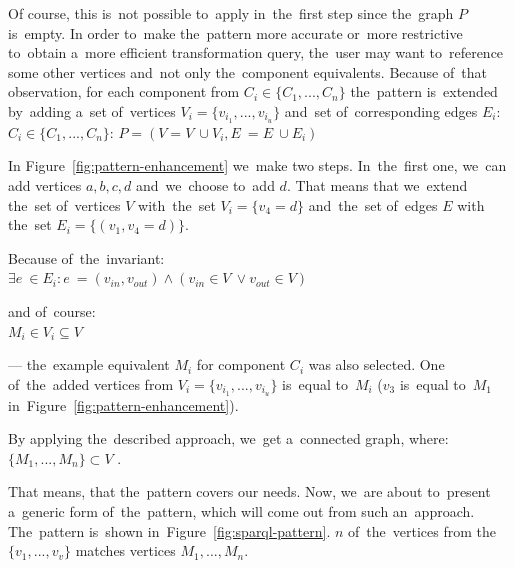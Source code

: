 Of course, this is~not possible to~apply in~the~first step since the~graph $P$ is~empty. 
In order to~make the~pattern more accurate or~more restrictive to~obtain a~more 
efficient transformation query, the~user may want to~reference some other 
vertices and~not only the~component equivalents.
Because of~that observation, for each component from $C_i \in \{C_1 ,..., C_n\}$ the~pattern is~extended by~adding a~set of~vertices $V_i = \{v_{i_1}, ..., v_{i_u}\}$ and~set of~corresponding edges 
$E_i$:\\

{\centering \forall $C_i \in \{C_1 ,..., C_n\}$: $P = (V = V~\cup V_i, E~= E~\cup E_i)$ \\[0.5cm]}

In Figure~\ref{fig:pattern-enhancement} we~make two steps. In~the~first one, we~can add vertices $a,b,c,d$ and~we~choose to~add $d$. That means that we~extend 
the~set of~vertices $V$ with~the~set $V_i = \{v_4 = d\}$ and~the~set of~edges $E$ with 
the~set $E_i = \{(v_1,v_4 = d)\}$.

Because of~the~invariant:\\

{\centering $\exists e~\in E_i: e~= (v_{in}, v_{out}) \land (v_{in} \in V~\lor v_{out} \in V)$\\[0.5cm]}

and of~course:\\

{\centering $M_i \in V_i \subseteq V$ \\[0.5cm]}

--- the~example equivalent $M_i$ for component $C_i$ was also selected. One of~the~added vertices from $V_i = \{v_{i_1}, ..., v_{i_u}\}$ is~equal to~$M_i$ ($v_3$ is~equal to~$M_1$
in~Figure~\ref{fig:pattern-enhancement}).
   
By applying the~described approach, we~get a~connected graph, where:\\

{\centering $\{M_1, ..., M_n\} \subset V$ .\\[0.5cm]}

That means, that the~pattern covers our needs. Now, we~are about to~present
a~generic form of~the~pattern, which will come out from 
such an~approach. The~pattern is~shown in~Figure~\ref{fig:sparql-pattern}. 
$n$ of~the~vertices from the~$\{v_1, ..., v_v\}$ matches vertices $M_1, ..., M_n$.

